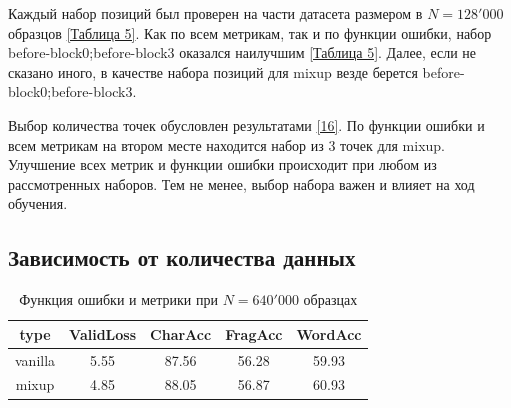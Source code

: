 Каждый набор позиций был проверен на части датасета размером в $N = 128'000$ образцов \hyperref[tab:mixup_position]{[Таблица 5]}. Как по всем метрикам, так и по функции ошибки, набор before-block0;before-block3 оказался наилучшим \hyperref[tab:mixup_position]{[Таблица 5]}. Далее, если не сказано иного, в качестве набора позиций для mixup везде берется before-block0;before-block3.

Выбор количества точек обусловлен результатами \hyperlink{cite.Bas19}{[16]}. По функции ошибки и всем метрикам на втором месте находится набор из 3 точек для mixup. Улучшение всех метрик и функции ошибки происходит при любом из рассмотренных наборов. Тем не менее, выбор набора важен и влияет на ход обучения.

\newpage
\subsection{Зависимость от количества данных}

\begin{table}[]
\centering
\begin{tabular}{||c c c c c||} 
 \hline
 type & ValidLoss & CharAcc & FragAcc & WordAcc \\ [0.5ex] 
 \hline\hline
 vanilla & 5.55 & 87.56 & 56.28 & 59.93\\ 
 \hline
 mixup & 4.85 & 88.05 & 56.87 & 60.93\\ [1ex] 
 \hline
\end{tabular}
\caption{Функция ошибки и метрики при $N = 640'000$ образцах}
\label{tab:mixup_size_max}
\end{table}

